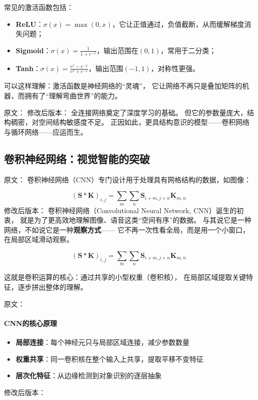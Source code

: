 常见的激活函数包括：

\begin{itemize}
\item \textbf{ReLU}：$\sigma(x) = \max(0, x)$，它让正值通过，负值截断，从而缓解梯度消失问题；
\item \textbf{Sigmoid}：$\sigma(x) = \frac{1}{1+e^{-x}}$，输出范围在$(0,1)$，常用于二分类；
\item \textbf{Tanh}：$\sigma(x) = \frac{e^x - e^{-x}}{e^x + e^{-x}}$，输出范围$(-1,1)$，对称性更强。
\end{itemize}

可以这样理解：激活函数是神经网络的“灵魂”，  
它让网络不再只是叠加矩阵的机器，而拥有了“理解弯曲世界”的能力。



原文：
修改后版本：
全连接网络奠定了深度学习的基础。  
但它的参数量庞大，结构稠密，对空间结构敏感度不足。  
正因如此，更具结构意识的模型——卷积网络与循环网络——应运而生。

\subsection{卷积神经网络：视觉智能的突破}

原文：
卷积神经网络（CNN）专门设计用于处理具有网格结构的数据，如图像：

$$(\mathbf{S} * \mathbf{K})_{i,j} = \sum_m \sum_n \mathbf{S}_{i+m,j+n} \mathbf{K}_{m,n}$$
修改后版本：
卷积神经网络（Convolutional Neural Network, CNN）诞生的初衷，  
就是为了更高效地理解图像、语音这类“空间有序”的数据。  
与其说它是一种网络，不如说它是一种\textbf{观察方式}——  
它不再一次性看全局，而是用一个小窗口，在局部区域滑动观察。

$$(\mathbf{S} * \mathbf{K})_{i,j} = \sum_m \sum_n \mathbf{S}_{i+m,j+n} \mathbf{K}_{m,n}$$

这就是卷积运算的核心：通过共享的小型权重（卷积核），  
在局部区域提取关键特征，逐步拼出整体的理解。



原文：
\paragraph{CNN的核心原理}
\begin{itemize}
\item \textbf{局部连接}：每个神经元只与局部区域连接，减少参数数量
\item \textbf{权重共享}：同一卷积核在整个输入上共享，提取平移不变特征
\item \textbf{层次化特征}：从边缘检测到对象识别的逐层抽象
\end{itemize}
修改后版本：
